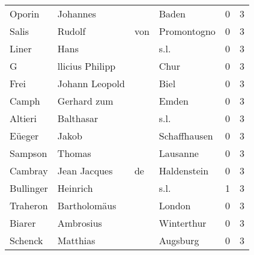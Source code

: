 \documentclass[10pt,a4paper,landscape]{article}
\begin{document}
\begin{longtable}{llllrr}
                   Oporin &                           Johannes &             &                                       Baden &          0 &         3 \\
                    Salis &                             Rudolf &         von &                                 Promontogno &          0 &         3 \\
                    Liner &                               Hans &             &                                        s.l. &          0 &         3 \\
                        G &                    llicius Philipp &             &                                        Chur &          0 &         3 \\
                     Frei &                     Johann Leopold &             &                                        Biel &          0 &         3 \\
                    Camph &                        Gerhard zum &             &                                       Emden &          0 &         3 \\
                  Altieri &                          Balthasar &             &                                        s.l. &          0 &         3 \\
                   Eüeger &                              Jakob &             &                                Schaffhausen &          0 &         3 \\
                  Sampson &                             Thomas &             &                                    Lausanne &          0 &         3 \\
                  Cambray &                       Jean Jacques &          de &                                 Haldenstein &          0 &         3 \\
                Bullinger &                           Heinrich &             &                                        s.l. &          1 &         3 \\
                 Traheron &                       Bartholomäus &             &                                      London &          0 &         3 \\
                   Biarer &                          Ambrosius &             &                                  Winterthur &          0 &         3 \\
                  Schenck &                           Matthias &             &                                    Augsburg &          0 &         3 \\

\end{longtable}
\end{document}
